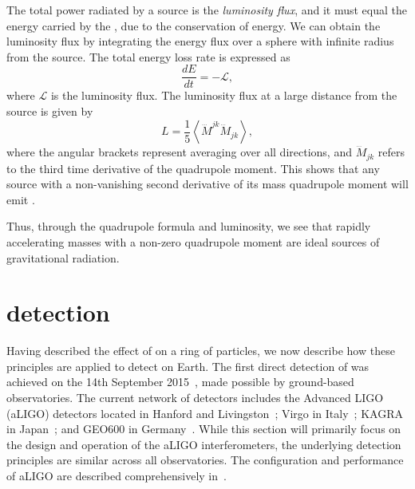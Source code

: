 The total power radiated by a source is the \textit{luminosity flux}, and it must equal the energy carried by the \gws, due to the conservation of energy. We can obtain the luminosity flux by integrating the energy flux over a sphere with infinite radius from the source. The total energy loss rate is expressed as
%
\begin{equation}
    \frac{dE}{dt} = -\mathcal{L},
    \label{1:eq:de_dt}
\end{equation}
%
where $\mathcal{L}$ is the \gwadj luminosity flux. The luminosity flux at a large distance from the source is given by~\cite{Creighton_book:2009}
%
\begin{equation}
    L = \frac{1}{5} \left\langle \dddot{M}^{jk} \dddot{M}_{jk} \right\rangle,
    \label{1:eq:luminosity_flux}
\end{equation}
%
where the angular brackets represent averaging over all directions, and $\dddot{M}_{jk}$ refers to the third time derivative of the quadrupole moment. This shows that any source with a non-vanishing second derivative of its mass quadrupole moment will emit \gws.

Thus, through the quadrupole formula and \gwadj luminosity, we see that rapidly accelerating masses with a non-zero quadrupole moment are ideal sources of gravitational radiation.





















\section{\label{1:sec:gravitational-wave-detection}\Gwadj detection}

Having described the effect of \gws on a ring of particles, we now describe how these principles are applied to detect \gws on Earth. The first direct detection of \gws was achieved on the 14th September 2015~\cite{GW150914:2016}, made possible by ground-based \gwadj observatories. The current network of \gwadj detectors includes the Advanced LIGO (aLIGO) detectors located in Hanford and Livingston~\cite{aLIGO:2015}; Virgo in Italy~\cite{aVirgo:2015}; KAGRA in Japan~\cite{KAGRA:2021}; and GEO600 in Germany~\cite{GEO600:2002}. While this section will primarily focus on the design and operation of the aLIGO interferometers, the underlying detection principles are similar across all observatories. The configuration and performance of aLIGO are described comprehensively in~\cite{aLIGO:2015}.

